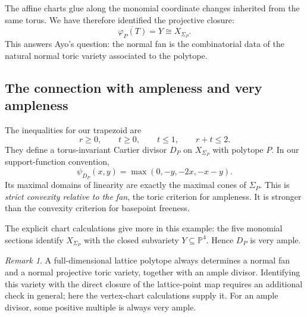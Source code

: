 \documentclass[11pt]{article}
\theoremstyle{definition}
\theoremstyle{remark}
\newtheorem{Rmk}{Remark}
\newcommand{\Sg}{\Sigma}
\newcommand{\bP}{\mathbb{P}}
\newcommand{\vf}{\varphi}
\begin{document}
The affine charts glue along the monomial coordinate changes inherited
from the same torus. We have therefore identified the projective closure:
\[
    \boxed{\overline{\vf_P(T)}=Y\cong X_{\Sg_P}.}
\]
This answers Ayo's question: the normal fan is the combinatorial data
of the natural normal toric variety associated to the polytope.

\subsection{The connection with ampleness and very ampleness}

The inequalities for our trapezoid are
\[
    r\geq0,\qquad t\geq0,\qquad t\leq1,\qquad r+t\leq2.
\]
They define a torus-invariant Cartier divisor \(D_P\) on
\(X_{\Sg_P}\) with polytope \(P\). In our support-function convention,
\[
    \psi_{D_P}(x,y)=\max(0,-y,-2x,-x-y).
\]
Its maximal domains of linearity are exactly the maximal cones of
\(\Sg_P\). This is \emph{strict convexity relative to the fan}, the
toric criterion for ampleness. It is stronger than the convexity
criterion for basepoint freeness.

The explicit chart calculations give more in this example: the five
monomial sections identify \(X_{\Sg_P}\) with the closed subvariety
\(Y\subseteq\bP^4\). Hence \(D_P\) is very ample.

\begin{Rmk}
    A full-dimensional lattice polytope always determines a normal fan
    and a normal projective toric variety, together with an ample
    divisor. Identifying this variety with the direct closure of the
    lattice-point map requires an additional check in general; here
    the vertex-chart calculations supply it. For an ample divisor,
    some positive multiple is always very ample.
\end{Rmk}
\end{document}
